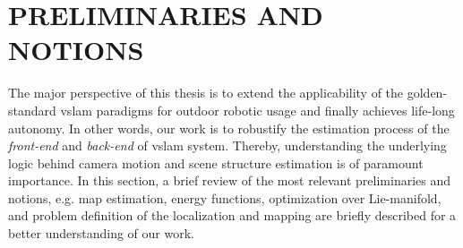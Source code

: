 \chapter{PRELIMINARIES AND NOTIONS}

The major perspective of this thesis is to extend the applicability of the golden-standard \acrshort{vslam} paradigms for outdoor robotic usage and finally achieves life-long autonomy.
In other words, our work is to robustify the estimation process of the {\em front-end} and {\em back-end} of \acrshort{vslam} system.
Thereby, understanding the underlying logic behind camera motion and scene structure estimation is of paramount importance.  
In this section, a brief review of the most relevant preliminaries and notions, e.g. \acrshort{map} estimation, energy functions, optimization over Lie-manifold, and problem definition of the localization and mapping are briefly described for a better understanding of our work.

